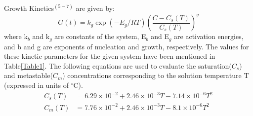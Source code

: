 \documentclass[3p,times]{elsarticle}
\begin{document}
Growth Kinetics$^{(5-7)}$ are given by:
\begin{equation}
G(t) = k_{g}\exp{\left(-E_{g}/RT \right)}\left(\frac{C - C_{s}(T)}{C_{s}(T)}\right)^{g}
\end{equation}
where k$_{b}$ and k$_{g}$ are constants of the system, E$_{b}$ and E$_{g}$ are activation energies, and b and g are exponents of nucleation and growth, respectively. The values for these kinetic parameters for the given system have been mentioned in Table\ref{Table1}. The following equations are used to evaluate the saturation($C_{s}$) and metastable($C_{m}$) concentrations corresponding to the solution temperature T (expressed in units of $^\circ$C)\cite{shi}. \\
\begin{align}
C_{s}(T) &= 6.29\times10^{-2} + 2.46\times10^{-3}T - 7.14\times10^{-6}T^{2} \label{sat}\\
C_{m}(T) &= 7.76\times10^{-2} + 2.46\times10^{-3}T - 8.1\times10^{-6}T^{2} \label{meta}
\end{align}
\end{document}
